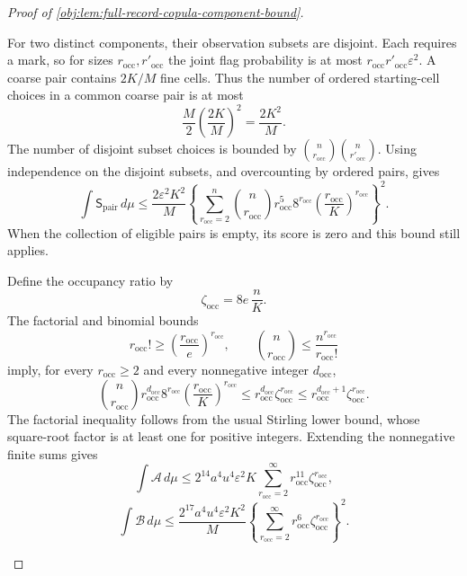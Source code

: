 \begin{proof}[Proof of \cref{obj:lem:full-record-copula-component-bound}]
\begin{enumerate}
For two distinct components, their observation subsets are disjoint. Each requires a mark, so for sizes
\(r_{\mathrm{occ}},r'_{\mathrm{occ}}\) the joint flag probability is at most
\(r_{\mathrm{occ}}r'_{\mathrm{occ}}\varepsilon^2\). A coarse pair contains
\(2K/M\) fine cells. Thus the number of ordered starting-cell choices in a common coarse pair is at most
\[
\frac M2\left(\frac{2K}{M}\right)^2=\frac{2K^2}{M}.
\]
The number of disjoint subset choices is bounded by
\(\binom n{r_{\mathrm{occ}}}\binom n{r'_{\mathrm{occ}}}\).
Using independence on the disjoint subsets, and overcounting by ordered pairs, gives
\[
\int\mathsf S_{\mathrm{pair}}\,d\mu
 \le
 \frac{2\varepsilon^2K^2}{M}
 \left\{
 \sum_{r_{\mathrm{occ}}=2}^{n}
 \binom n{r_{\mathrm{occ}}}
 r_{\mathrm{occ}}^{5}8^{r_{\mathrm{occ}}}
 \left(\frac{r_{\mathrm{occ}}}{K}\right)^{r_{\mathrm{occ}}}
 \right\}^{2}.
\]
When the collection of eligible pairs is empty, its score is zero and this bound still applies.

Define the occupancy ratio by
\[
\zeta_{\mathrm{occ}}=8e\,\frac nK.
\]
The factorial and binomial bounds
\[
r_{\mathrm{occ}}!\ge
 \left(\frac{r_{\mathrm{occ}}}{e}\right)^{r_{\mathrm{occ}}},
\qquad
\binom n{r_{\mathrm{occ}}}
 \le\frac{n^{r_{\mathrm{occ}}}}{r_{\mathrm{occ}}!}
\]
imply, for every \(r_{\mathrm{occ}}\ge2\) and every nonnegative integer
\(d_{\mathrm{occ}}\),
\[
\binom n{r_{\mathrm{occ}}}
 r_{\mathrm{occ}}^{d_{\mathrm{occ}}}8^{r_{\mathrm{occ}}}
 \left(\frac{r_{\mathrm{occ}}}{K}\right)^{r_{\mathrm{occ}}}
 \le
 r_{\mathrm{occ}}^{d_{\mathrm{occ}}}
 \zeta_{\mathrm{occ}}^{r_{\mathrm{occ}}}
 \le
 r_{\mathrm{occ}}^{d_{\mathrm{occ}}+1}
 \zeta_{\mathrm{occ}}^{r_{\mathrm{occ}}}.
\]
The factorial inequality follows from the usual Stirling lower bound, whose square-root factor is at least one for positive integers. Extending the nonnegative finite sums gives
\[
\int\mathcal A\,d\mu
 \le
 2^{14}a^4u^4\varepsilon^2K
 \sum_{r_{\mathrm{occ}}=2}^{\infty}
 r_{\mathrm{occ}}^{11}
 \zeta_{\mathrm{occ}}^{r_{\mathrm{occ}}},
\]
\[
\int\mathcal B\,d\mu
 \le
 \frac{2^{17}a^4u^4\varepsilon^2K^2}{M}
 \left\{
 \sum_{r_{\mathrm{occ}}=2}^{\infty}
 r_{\mathrm{occ}}^{6}
 \zeta_{\mathrm{occ}}^{r_{\mathrm{occ}}}
 \right\}^{2}.
\]


\end{enumerate}
\end{proof}
